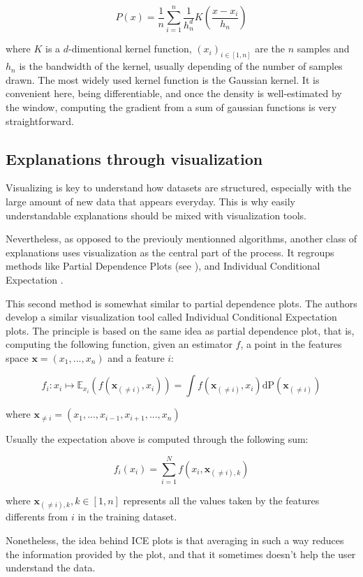 \documentclass[a4paper,11pt]{kth-mag}
\begin{document}
\[
	P(x) = \frac{1}{n} \sum_{i=1}^n \frac1{h_n^d} K \left( \frac{x - x_i}{h_n} \right)
\]

where $K$ is a $d$-dimentional kernel function, $(x_i)_{i \in [1,n]}$ are the $n$ samples and $h_n$ is the bandwidth of the kernel, usually depending of the number of samples drawn. The most widely used kernel function is the Gaussian kernel. It is convenient here, being differentiable, and once the density is well-estimated by the window, computing the gradient from a sum of gaussian functions is very straightforward.

\subsection{Explanations through visualization}

Visualizing is key to understand how datasets are structured, especially with the large amount of new data that appears everyday. This is why easily understandable explanations should be mixed with visualization tools.

Nevertheless, as opposed to the previouly mentionned algorithms, another class of explanations uses visualization as the central part of the process. It regroups methods like Partial Dependence Plots (see \cite{elementsofstats}), and Individual Conditional Expectation \cite{ice}.

This second method is somewhat similar to partial dependence plots. The authors develop a similar visualization tool called Individual Conditional Expectation plots. The principle is based on the same idea as partial dependence plot, that is, computing the following function, given an estimator $f$, a point in the features space $\mathbf{x} = (x_1, ..., x_n)$ and a feature $i$:

\[
	f_i : x_i \mapsto \mathbb{E}_{x_i} (f(\mathbf{x}_{(\neq i)}, x_i)) = \int f(\mathbf{x}_{(\neq i)}, x_i) \mathrm{dP}(\mathbf{x}_{(\neq i)})
\]

where $\mathbf{x}_{\neq i} = (x_1, ..., x_{i-1}, x_{i+1}, ..., x_n)$

Usually the expectation above is computed through the following sum:

\[
	f_i(x_i) = \sum_{i=1}^{N} f(x_i, \mathbf{x}_{(\neq i),k})
\]

where $\mathbf{x}_{(\neq i),k}, k \in [1, n]$ represents all the values taken by the features differents from $i$ in the training dataset.

Nonetheless, the idea behind ICE plots is that averaging in such a way reduces the information provided by the plot, and that it sometimes doesn't help the user understand the data.
\end{document}
